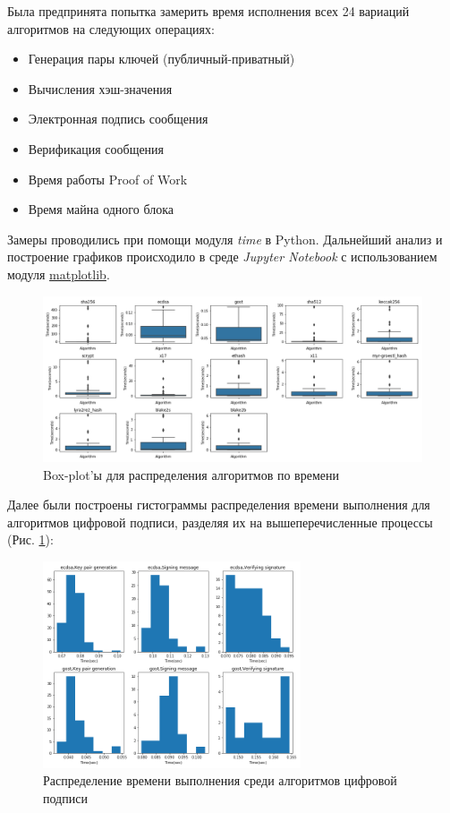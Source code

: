 Была предпринята попытка замерить время исполнения всех 24 вариаций алгоритмов на следующих операциях:

\begin{itemize}
\item Генерация пары ключей (публичный-приватный)
\item Вычисления хэш-значения
\item Электронная подпись сообщения
\item Верификация сообщения
\item Время работы Proof of Work
\item Время майна одного блока
\end{itemize}

Замеры проводились при помощи модуля \emph{time} в Python. Дальнейший анализ и
построение графиков происходило в среде \emph{Jupyter Notebook} с
использованием модуля \underline{matplotlib}.

\begin{figure}
    \centering
    \includegraphics[width=\textwidth]{./images/boxes}
    \caption{Box-plot'ы для распределения алгоритмов по времени}
\end{figure}

Далее были построены гистограммы распределения времени выполнения для
алгоритмов цифровой подписи, разделяя их на вышеперечисленные процессы (Рис. \ref{dss}):

\begin{figure}[h]
    \centering
    \includegraphics[width=0.68\textwidth]{./images/hists_dss}
    \caption{Распределение времени выполнения среди алгоритмов цифровой подписи}\label{dss}
\end{figure}

